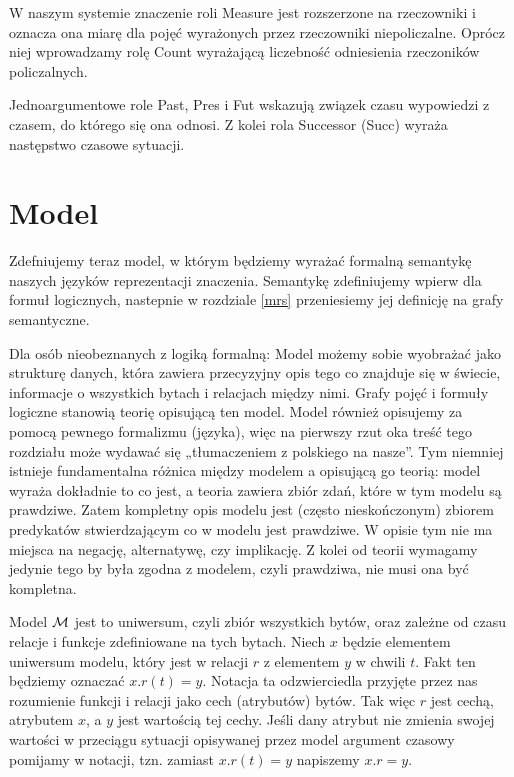\documentclass[a4paper,12pt]{article}
\begin{document}
W naszym systemie znaczenie roli Measure jest rozszerzone na rzeczowniki i oznacza ona miarę dla pojęć wyrażonych przez rzeczowniki niepoliczalne.
Oprócz niej wprowadzamy rolę Count wyrażającą liczebność odniesienia rzeczoników policzalnych.

Jednoargumentowe role Past, Pres i Fut wskazują związek czasu wypowiedzi z czasem, do którego się ona odnosi.
Z kolei rola Successor (Succ) wyraża następstwo czasowe sytuacji.

\section{Model}
Zdefniujemy teraz model, w którym będziemy wyrażać formalną semantykę naszych języków reprezentacji znaczenia.
Semantykę zdefiniujemy wpierw dla formuł logicznych, nastepnie w rozdziale \ref{mrs} przeniesiemy jej definicję na grafy semantyczne.

Dla osób nieobeznanych z logiką formalną: 
Model możemy sobie wyobrażać jako strukturę danych, która zawiera przecyzyjny opis tego 
co znajduje się w świecie, informacje o wszystkich bytach i relacjach między nimi.
Grafy pojęć i formuły logiczne stanowią teorię opisującą ten model.
Model również opisujemy za pomocą pewnego formalizmu (języka),
więc na pierwszy rzut oka treść tego rozdziału może wydawać się „tłumaczeniem z polskiego na nasze”.
Tym niemniej istnieje fundamentalna różnica między modelem a opisującą go teorią:
model wyraża dokładnie to co jest, a teoria zawiera zbiór zdań, które w tym modelu są prawdziwe.
Zatem kompletny opis modelu jest (często nieskończonym) zbiorem predykatów stwierdzającym 
co w modelu jest prawdziwe. W opisie tym nie ma miejsca na negację, alternatywę, czy implikację.
Z kolei od teorii wymagamy jedynie tego by była zgodna z modelem, czyli prawdziwa, nie musi ona być kompletna.

Model $\cal M$ jest to uniwersum, czyli zbiór wszystkich bytów, oraz zależne od czasu relacje i 
funkcje zdefiniowane na tych bytach. Niech $x$ będzie elementem uniwersum modelu, który jest w relacji $r$ z elementem $y$ w chwili $t$.
Fakt ten będziemy oznaczać $x.r(t)=y$. Notacja ta odzwierciedla przyjęte przez nas rozumienie 
funkcji i relacji jako cech (atrybutów) bytów. Tak więc $r$ jest cechą, atrybutem $x$, a $y$ jest wartością tej cechy.
Jeśli dany atrybut nie zmienia swojej wartości w przeciągu sytuacji opisywanej przez model argument czasowy pomijamy w notacji,
tzn. zamiast $x.r(t)=y$ napiszemy $x.r=y$.
\end{document}
